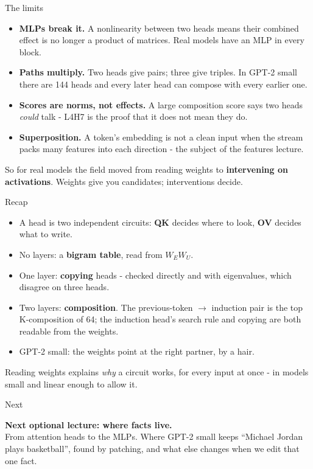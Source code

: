 \documentclass[aspectratio=169]{beamer}
\newcommand{\trapbox}[1]{%
  \begin{tcolorbox}[colback=armred!8, colframe=armred, boxrule=0.6pt, arc=2pt]
  #1
  \end{tcolorbox}}
\newcommand{\takebox}[1]{%
  \begin{tcolorbox}[colback=paramgreen!8, colframe=paramgreen, boxrule=0.6pt, arc=2pt]
  #1
  \end{tcolorbox}}
\begin{document}
\begin{frame}{The limits}
  \vspace{0.4em}
  \begin{itemize}
    \item \textbf{MLPs break it.} A nonlinearity between two heads means their combined effect is no
      longer a product of matrices. Real models have an MLP in every block.
    \item \textbf{Paths multiply.} Two heads give pairs; three give triples. In GPT-2 small there are
      144 heads and every later head can compose with every earlier one.
    \item \textbf{Scores are norms, not effects.} A large composition score says two heads
      \emph{could} talk - L4H7 is the proof that it does not mean they do.
    \item \textbf{Superposition.} A token's embedding is not a clean input when the stream packs
      many features into each direction - the subject of the features lecture.
  \end{itemize}

  \vspace{0.4em}
  \trapbox{\small So for real models the field moved from reading weights to \textbf{intervening on
  activations}. Weights give you candidates; interventions decide.}
\end{frame}

\begin{frame}{Recap}
  \vspace{0.3em}
  \begin{itemize}
    \item A head is two independent circuits: \textbf{QK} decides where to look, \textbf{OV} decides
      what to write.
    \item No layers: a \textbf{bigram table}, read from $W_E W_U$.
    \item One layer: \textbf{copying} heads - checked directly and with eigenvalues, which disagree
      on three heads.
    \item Two layers: \textbf{composition}. The previous-token $\rightarrow$ induction pair is the top
      K-composition of 64; the induction head's search rule and copying are both readable from the
      weights.
    \item GPT-2 small: the weights point at the right partner, by a hair.
  \end{itemize}

  \vspace{0.4em}
  \takebox{\small Reading weights explains \emph{why} a circuit works, for every input at once - in
  models small and linear enough to allow it.}
\end{frame}

\begin{frame}{Next}
  \vspace{1.2em}
  \takebox{\textbf{Next optional lecture: where facts live.}\\[0.6em]
  From attention heads to the MLPs. Where GPT-2 small keeps ``Michael Jordan plays basketball'',
  found by patching, and what else changes when we edit that one fact.}
\end{frame}
\end{document}
